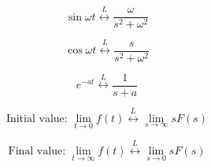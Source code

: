 \documentclass[a4paper]{article}
\begin{document}
\begin{displaymath}
\sin \omega t
\stackrel{L}{\longleftrightarrow}
\frac{\omega}{s^2 + \omega ^2}
\end{displaymath}

\begin{displaymath}
\cos \omega t
\stackrel{L}{\longleftrightarrow}
\frac{s}{s^2 + \omega ^2}
\end{displaymath}

\begin{displaymath}
e^{-at}
\stackrel{L}{\longleftrightarrow}
\frac{1}{s+a}
\end{displaymath}

\begin{displaymath}
\textrm{Initial value: }
\lim_{t\rightarrow 0} f(t)
\stackrel{L}{\longleftrightarrow}
\lim_{s\rightarrow\infty} sF(s)
\end{displaymath}

\begin{displaymath}
\textrm{Final value: }
\lim_{t\rightarrow\infty} f(t)
\stackrel{L}{\longleftrightarrow}
\lim_{s\rightarrow 0} sF(s)
\end{displaymath}
\end{document}
